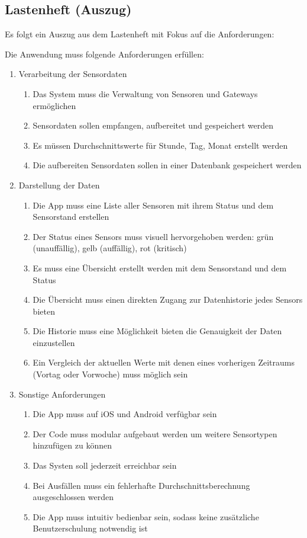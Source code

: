 \subsection{Lastenheft (Auszug)}
\label{app:Lastenheft}
Es folgt ein Auszug aus dem Lastenheft mit Fokus auf die Anforderungen:

Die Anwendung muss folgende Anforderungen erfüllen: 
\begin{enumerate}[itemsep=0em,partopsep=0em,parsep=0em,topsep=0em]
\item Verarbeitung der Sensordaten
	\begin{enumerate}
	\item Das System muss die Verwaltung von Sensoren und Gateways ermöglichen
	\item Sensordaten sollen empfangen, aufbereitet und gespeichert werden
	\item Es müssen Durchschnittswerte für Stunde, Tag, Monat erstellt werden
	\item Die aufbereiten Sensordaten sollen in einer Datenbank gespeichert werden
	\end{enumerate}
\item Darstellung der Daten
	\begin{enumerate}
	\item Die App muss eine Liste aller Sensoren mit ihrem Status und dem Sensorstand erstellen
	\item Der Status eines Sensors muss visuell hervorgehoben werden: grün (unauffällig), gelb (auffällig), rot (kritisch)
	\item Es muss eine Übersicht erstellt werden mit dem Sensorstand und dem Status
	\item Die Übersicht muss einen direkten Zugang zur Datenhistorie jedes Sensors bieten
	\item Die Historie muss eine Möglichkeit bieten die Genauigkeit der Daten einzustellen
	\item Ein Vergleich der aktuellen Werte mit denen eines vorherigen Zeitraums (\zB Vortag oder Vorwoche) muss möglich sein
	\end{enumerate}
\item Sonstige Anforderungen
	\begin{enumerate}
	\item Die App muss auf iOS und Android verfügbar sein
	\item Der Code muss modular aufgebaut werden um weitere Sensortypen hinzufügen zu können
	\item Das Systen soll jederzeit erreichbar sein
	\item Bei Ausfällen muss ein fehlerhafte Durchschnittsberechnung ausgeschlossen werden
	\item Die App muss intuitiv bedienbar sein, sodass keine zusätzliche Benutzerschulung notwendig ist
	\end{enumerate}
\end{enumerate}

